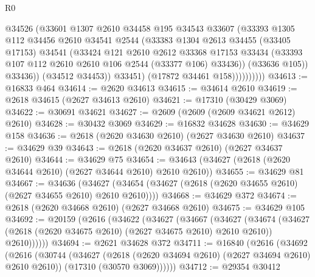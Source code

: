 \begin{lexlean}{R0}
\begin{coremodule}
                          @34526
                          (@33601
                            @1307
                            @2610
                            @34458
                            @195
                            @34543
                            @33607
                            (@33393
                              @1305
                              @112
                              @34456
                              @2610
                              @34541
                              @2544
                              (@33383
                                @1304
                                @2613
                                @34455
                                (@33405 @17153)
                                @34541
                                (@33424
                                  @121
                                  @2610
                                  @2612
                                  @33368
                                  @17153
                                  @33434
                                  (@33393 @107 @112 @2610 @2610 @106 @2544 (@33377 @106) @33436))
                                (@33636 @105))
                              @33436))
                          (@34512 @34453))
                        @33451)
                      (@17872 @34461 @158))))))))))
@34613 := @16833 @464
@34614 := @2620 @34613
@34615 := @34614 @2610
@34619 := @2618 @34615 (@2627 @34613 @2610)
@34621 := @17310 (@30429 @3069)
@34622 := @30691 @34621
@34627 := @2609 (@2609 (@2609 @34621 @2612) @2610)
@34628 := @30432 @3069
@34629 := @16832 @34628
@34630 := @34629 @158
@34636 := @2618 (@2620 @34630 @2610) (@2627 @34630 @2610)
@34637 := @34629 @39
@34643 := @2618 (@2620 @34637 @2610) (@2627 @34637 @2610)
@34644 := @34629 @75
@34654 := @34643 (@34627 (@2618 (@2620 @34644 @2610) (@2627 @34644 @2610) @2610 @2610))
@34655 := @34629 @81
@34667 := @34636
    (@34627 (@34654 (@34627 (@2618 (@2620 @34655 @2610) (@2627 @34655 @2610) @2610 @2610))))
@34668 := @34629 @372
@34674 := @2618 (@2620 @34668 @2610) (@2627 @34668 @2610)
@34675 := @34629 @105
@34692 := @20159
    (@2616
      (@34622
        (@34627
          (@34667
            (@34627
              (@34674
                (@34627 (@2618 (@2620 @34675 @2610) (@2627 @34675 @2610) @2610 @2610))
                @2610))))))
@34694 := @2621 @34628 @372
@34711 := @16840
    (@2616
      (@34692
        (@2616
          (@30744
            (@34627 (@2618 (@2620 @34694 @2610) (@2627 @34694 @2610) @2610 @2610))
            (@17310 (@30570 @3069))))))
@34712 := @29354 @30412

\end{coremodule}
\end{lexlean}
